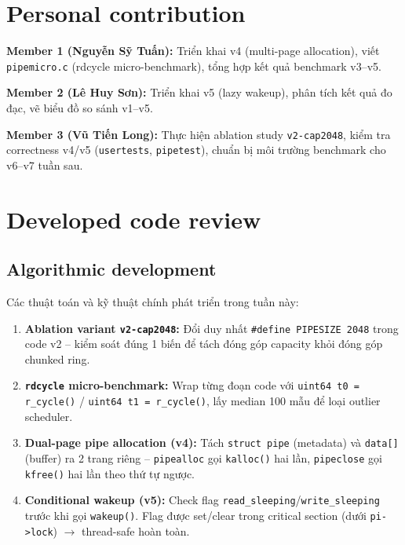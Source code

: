 \documentclass[11pt,a4paper]{article}
\begin{document}
\section{Personal contribution}

\textbf{Member 1 (Nguyễn Sỹ Tuấn):} Triển khai v4 (multi-page allocation), viết \texttt{pipemicro.c} (rdcycle micro-benchmark), tổng hợp kết quả benchmark v3--v5.

\textbf{Member 2 (Lê Huy Sơn):} Triển khai v5 (lazy wakeup), phân tích kết quả đo đạc, vẽ biểu đồ so sánh v1--v5.

\textbf{Member 3 (Vũ Tiến Long):} Thực hiện ablation study \texttt{v2-cap2048}, kiểm tra correctness v4/v5 (\texttt{usertests}, \texttt{pipetest}), chuẩn bị môi trường benchmark cho v6--v7 tuần sau.

\section{Developed code review}

\subsection{Algorithmic development}

Các thuật toán và kỹ thuật chính phát triển trong tuần này:

\begin{enumerate}
  \item \textbf{Ablation variant \texttt{v2-cap2048}:} Đổi duy nhất \texttt{\#define PIPESIZE 2048} trong code v2 -- kiểm soát đúng 1 biến để tách đóng góp capacity khỏi đóng góp chunked ring.
  \item \textbf{\texttt{rdcycle} micro-benchmark:} Wrap từng đoạn code với \texttt{uint64 t0 = r\_cycle()} / \texttt{uint64 t1 = r\_cycle()}, lấy median 100 mẫu để loại outlier scheduler.
  \item \textbf{Dual-page pipe allocation (v4):} Tách \texttt{struct pipe} (metadata) và \texttt{data[]} (buffer) ra 2 trang riêng -- \texttt{pipealloc} gọi \texttt{kalloc()} hai lần, \texttt{pipeclose} gọi \texttt{kfree()} hai lần theo thứ tự ngược.
  \item \textbf{Conditional wakeup (v5):} Check flag \texttt{read\_sleeping}/\texttt{write\_sleeping} trước khi gọi \texttt{wakeup()}. Flag được set/clear trong critical section (dưới \texttt{pi->lock}) $\rightarrow$ thread-safe hoàn toàn.
\end{enumerate}
\end{document}
